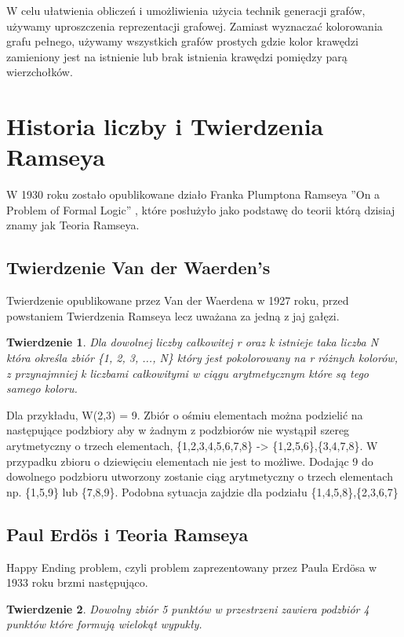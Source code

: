 \documentclass[11pt]{article}
\newtheorem{theorem}{Twierdzenie}
\begin{document}
W celu ułatwienia obliczeń i umożliwienia użycia technik generacji grafów, używamy uproszczenia reprezentacji grafowej. Zamiast wyznaczać kolorowania grafu pełnego, używamy wszystkich grafów prostych gdzie kolor krawędzi zamieniony jest na istnienie lub brak istnienia krawędzi pomiędzy parą wierzchołków.

\section{Historia liczby i Twierdzenia Ramseya}

W 1930 roku zostało opublikowane działo Franka Plumptona Ramseya ''On a Problem of Formal Logic''\cite{ramsey} , które posłużyło jako podstawę do teorii którą dzisiaj znamy jak Teoria Ramseya. 


\subsection{Twierdzenie Van der Waerden's}
Twierdzenie opublikowane przez Van der Waerdena w 1927 roku, przed powstaniem Twierdzenia Ramseya lecz uważana za jedną z jaj gałęzi. 

\begin{theorem}
Dla dowolnej liczby całkowitej r oraz k istnieje taka liczba N która określa zbiór \{1, 2, 3, ..., N\} który jest pokolorowany na r różnych kolorów, z przynajmniej k liczbami całkowitymi w ciągu arytmetycznym które są tego samego koloru.\cite{theory} 
\end{theorem}

Dla przykładu, W(2,3) = 9. Zbiór o ośmiu elementach można podzielić na następujące podzbiory aby w żadnym z podzbiorów nie wystąpił szereg arytmetyczny o trzech elementach, \{1,2,3,4,5,6,7,8\} -> \{1,2,5,6\},\{3,4,7,8\}. W przypadku zbioru o dziewięciu elementach nie jest to możliwe. Dodając 9 do dowolnego podzbioru utworzony zostanie ciąg arytmetyczny o trzech elementach np. \{1,5,9\} lub \{7,8,9\}. Podobna sytuacja zajdzie dla podziału \{1,4,5,8\},\{2,3,6,7\}

\subsection{Paul Erd\"os i Teoria Ramseya}

Happy Ending problem, czyli problem zaprezentowany przez Paula Erd\"osa w 1933 roku brzmi następująco. 

\begin{theorem}
Dowolny zbiór 5 punktów w przestrzeni zawiera podzbiór 4 punktów które formują wielokąt wypukły.
\end{theorem}
\end{document}
